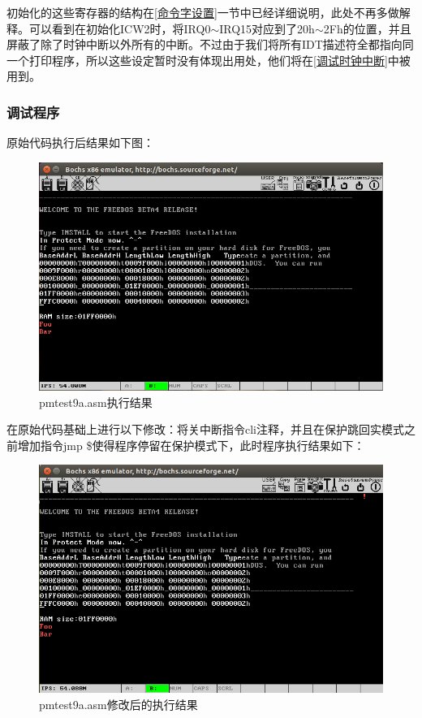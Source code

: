 \documentclass[UTF8,12pt]{ctexart}
\begin{document}
    初始化的这些寄存器的结构在\ref{命令字设置}一节中已经详细说明，此处不再多做解释。可以看到在初始化ICW2时，将IRQ0$\sim$IRQ15对应到了20h$\sim$2Fh的位置，并且屏蔽了除了时钟中断以外所有的中断。不过由于我们将所有IDT描述符全都指向同一个打印程序，所以这些设定暂时没有体现出用处，他们将在\ref{调试时钟中断}中被用到。

    \subsubsection{调试程序\label{9a调试}}
    原始代码执行后结果如下图：
    \begin{figure}[H]
        \centering
        \includegraphics[width=12cm]{images/无!的输出.png}
        \caption{pmtest9a.asm执行结果}
        \label{无!的输出}
    \end{figure}
    
    在原始代码基础上进行以下修改：将关中断指令cli注释，并且在保护跳回实模式之前增加指令jmp \$使得程序停留在保护模式下，此时程序执行结果如下：
    \begin{figure}[H]
        \centering
        \includegraphics[width=12cm]{images/有!的输出.png}
        \caption{pmtest9a.asm修改后的执行结果}
        \label{有!的输出}
    \end{figure}
    
\end{document}
